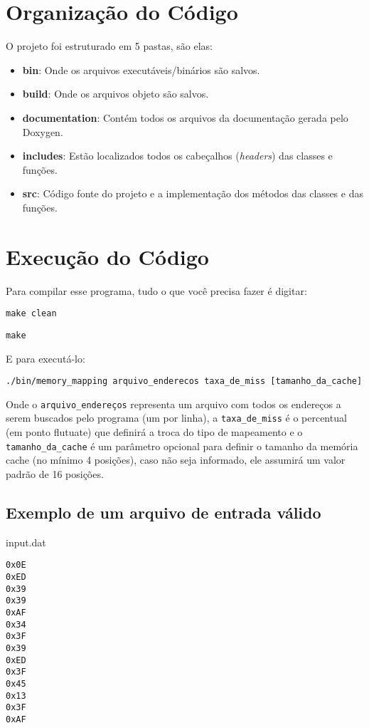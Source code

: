 \documentclass[12pt,openright,oneside,a4paper,english,brazil]{abntex2}
\newcommand{\code}[1]{\colorbox{codegray}{\texttt{#1}}}
\begin{document}
\section*{Organização do Código}
O projeto foi estruturado em 5 pastas, são elas:
\begin{itemize}
\item \textbf{bin}:           Onde os arquivos executáveis/binários são salvos.
\item \textbf{build}:         Onde os arquivos objeto são salvos.
\item \textbf{documentation}: Contém todos os arquivos da documentação gerada pelo Doxygen.
\item \textbf{includes}:      Estão localizados todos os cabeçalhos (\textit{headers}) das classes e funções.
\item \textbf{src}:           Código fonte do projeto e a implementação dos métodos das classes e das funções.
\end{itemize}

\section*{Execução do Código}
Para compilar esse programa, tudo o que você precisa fazer é digitar:

\code{\textdollar make clean}

\code{\textdollar make}

E para executá-lo:

\code{\textdollar ./bin/memory\_mapping arquivo\_enderecos taxa\_de\_miss [tamanho\_da\_cache]}

Onde o \code{arquivo\_endereços} representa um arquivo com todos os endereços a serem buscados pelo programa (um por linha), a \code{taxa\_de\_miss} é o percentual (em ponto flutuate) que definirá a troca do tipo de mapeamento e o \code{tamanho\_da\_cache} é um parâmetro opcional para definir o tamanho da memória cache (no mínimo 4 posições), caso não seja informado, ele assumirá um valor padrão de 16 posições.

\newpage

\subsection*{Exemplo de um arquivo de entrada válido}

\noindent
input.dat

\begin{lstlisting}
0x0E
0xED
0x39
0x39
0xAF
0x34
0x3F
0x39
0xED
0x3F
0x45
0x13
0x3F
0xAF
\end{lstlisting}
\end{document}

